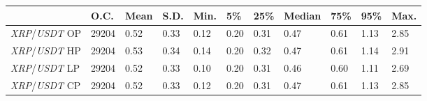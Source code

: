 \begin{tabular}{lllllllllll}
\toprule
 & \textbf{O.C.} & \textbf{Mean} & \textbf{S.D.} & \textbf{Min.} & \textbf{5\%} & \textbf{25\%} & \textbf{Median} & \textbf{75\%} & \textbf{95\%} & \textbf{Max.} \\
\midrule
\emph{XRP}/\emph{USDT} OP & 29204 & 0.52 & 0.33 & 0.12 & 0.20 & 0.31 & 0.47 & 0.61 & 1.13 & 2.85 \\
\emph{XRP}/\emph{USDT} HP & 29204 & 0.53 & 0.34 & 0.14 & 0.20 & 0.32 & 0.47 & 0.61 & 1.14 & 2.91 \\
\emph{XRP}/\emph{USDT} LP & 29204 & 0.52 & 0.33 & 0.10 & 0.20 & 0.31 & 0.46 & 0.60 & 1.11 & 2.69 \\
\emph{XRP}/\emph{USDT} CP & 29204 & 0.52 & 0.33 & 0.12 & 0.20 & 0.31 & 0.47 & 0.61 & 1.13 & 2.85 \\
\bottomrule
\end{tabular}
